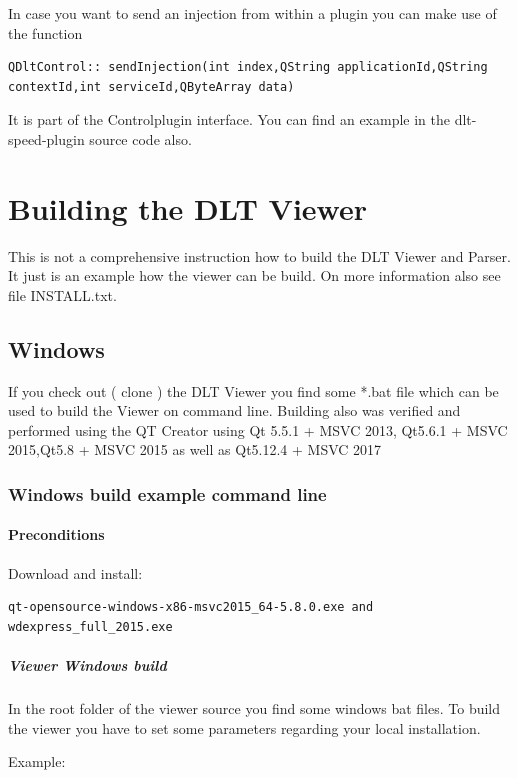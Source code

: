 \documentclass[a4paper,11pt]{article}
\begin{document}
In case you want to send an injection from within a plugin you can make use of the function 
\begin{verbatim}
QDltControl:: sendInjection(int index,QString applicationId,QString contextId,int serviceId,QByteArray data)
\end{verbatim}
It is part of the Controlplugin interface. You can find an example in the dlt-speed-plugin source code also.


\pagebreak


\section{Building the DLT Viewer}
This is not a comprehensive instruction how to build the DLT Viewer and Parser.
It just is an example how the viewer can be build. On more information also see file INSTALL.txt.

\subsection{Windows}
If you check out ( clone ) the DLT Viewer you find some *.bat file which can be used to build the Viewer on command line.
Building also was verified and performed using the QT Creator using Qt 5.5.1 + MSVC 2013, Qt5.6.1 + MSVC 2015,Qt5.8 + MSVC 2015
as well as Qt5.12.4 + MSVC 2017


\subsubsection{Windows build example command line}
\paragraph{Preconditions}
Download and install:
\begin{verbatim}
qt-opensource-windows-x86-msvc2015_64-5.8.0.exe and
wdexpress_full_2015.exe
\end{verbatim}

\subparagraph{Viewer Windows build}
In the root folder of the viewer source you find some windows bat files.
To build the viewer you have to set some parameters regarding your local installation.

Example:
\end{document}
